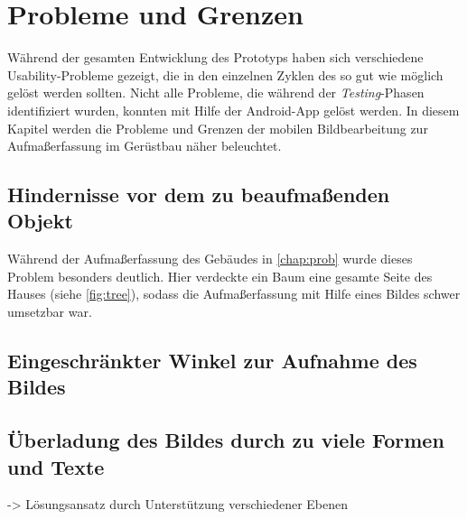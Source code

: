 \chapter{Probleme und Grenzen}
Während der gesamten Entwicklung des Prototyps haben sich verschiedene Usability-Probleme gezeigt, die in den einzelnen Zyklen des \hcdp{} so gut wie möglich gelöst werden sollten.
Nicht alle Probleme, die während der \emph{Testing}-Phasen identifiziert wurden, konnten mit Hilfe der Android-App gelöst werden.
In diesem Kapitel werden die Probleme und Grenzen der mobilen Bildbearbeitung zur Aufmaßerfassung im Gerüstbau näher beleuchtet.

\section{Hindernisse vor dem zu beaufmaßenden Objekt}
Während der Aufmaßerfassung des Gebäudes in \autoref{chap:prob} wurde dieses Problem besonders deutlich.
Hier verdeckte ein Baum eine gesamte Seite des Hauses (siehe \autoref{fig:tree}), sodass die Aufmaßerfassung mit Hilfe eines Bildes schwer umsetzbar war.

\section{Eingeschränkter Winkel zur Aufnahme des Bildes}


\section{Überladung des Bildes durch zu viele Formen und Texte}
-> Lösungsansatz durch Unterstützung verschiedener Ebenen
